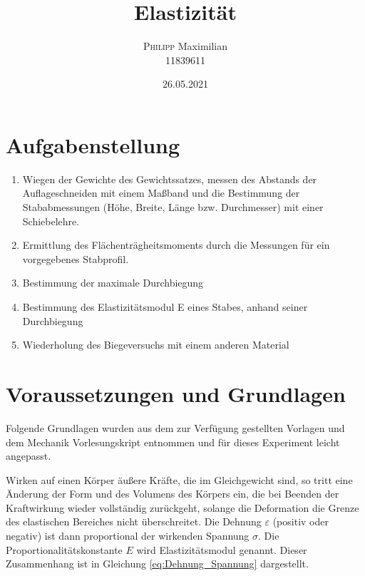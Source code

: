 \documentclass[11pt,ngerman]{scrartcl}
\begin{document}
\title{Elastizität}
\author{\textsc{Philipp} Maximilian\\11839611}
\date{26.05.2021}
\maketitle

\tableofcontents
\newpage
\section{Aufgabenstellung}
\label{sec:aufgabenstellung} 

\begin{enumerate}
    \item Wiegen der Gewichte des Gewichtssatzes, messen des Abstands
        der Auflageschneiden mit einem Maßband und die Bestimmung der Stababmessungen (Höhe,
        Breite, Länge bzw.  Durchmesser) mit einer Schiebelehre.
    \item Ermittlung des Flächenträgheitsmoments durch die Messungen für ein vorgegebenes Stabprofil.
    \item Bestimmung der maximale Durchbiegung
    \item Bestimmung des Elastizitätsmodul E eines Stabes, anhand seiner Durchbiegung
    \item Wiederholung des Biegeversuchs mit einem anderen Material
\end{enumerate}

\section{Voraussetzungen und Grundlagen} \label{sec:voraussetzungen_grundlagen}
Folgende Grundlagen wurden aus dem zur Verfügung gestellten Vorlagen
\cite{vorlageelast1} \cite{vorlageelast2}  und dem Mechanik Vorlesungskript \cite{Knoll2020}
entnommen und für dieses Experiment leicht angepasst.

Wirken auf einen Körper äußere Kräfte, die im Gleichgewicht sind, so tritt eine
Änderung der Form und des Volumens des Körpers ein, die bei Beenden der
Kraftwirkung wieder vollständig zurückgeht, solange die Deformation die Grenze
des elastischen Bereiches nicht überschreitet. Die Dehnung $\varepsilon$
(positiv oder negativ) ist dann proportional der wirkenden Spannung $\sigma$.
Die Proportionalitätskonstante $E$ wird Elastizitätsmodul genannt. Dieser
Zusammenhang ist in Gleichung \ref{eq:Dehnung_Spannung} dargestellt.
\end{document}
